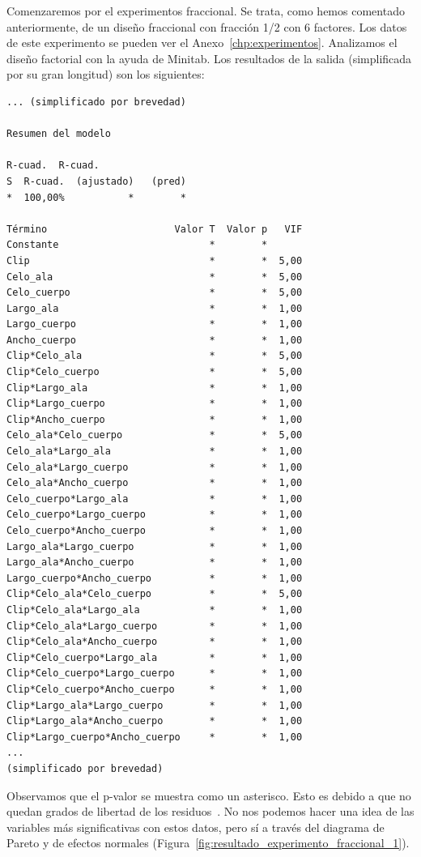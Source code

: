 \documentclass[12pt,a4paper,twoside,openright,titlepage,final]{article}
\begin{document}
Comenzaremos por el experimentos fraccional. Se trata, como hemos comentado anteriormente, de un diseño fraccional con fracción 1/2 con 6 factores. Los datos de este experimento se pueden ver el Anexo~\ref{chp:experimentos}. Analizamos el diseño factorial con la ayuda de Minitab. Los resultados de la salida (simplificada por su gran longitud) son los siguientes:

\begin{verbatim}
... (simplificado por brevedad)

Resumen del modelo

R-cuad.  R-cuad.
S  R-cuad.  (ajustado)   (pred)
*  100,00%           *        *

Término                      Valor T  Valor p   VIF
Constante                          *        *
Clip                               *        *  5,00
Celo_ala                           *        *  5,00
Celo_cuerpo                        *        *  5,00
Largo_ala                          *        *  1,00
Largo_cuerpo                       *        *  1,00
Ancho_cuerpo                       *        *  1,00
Clip*Celo_ala                      *        *  5,00
Clip*Celo_cuerpo                   *        *  5,00
Clip*Largo_ala                     *        *  1,00
Clip*Largo_cuerpo                  *        *  1,00
Clip*Ancho_cuerpo                  *        *  1,00
Celo_ala*Celo_cuerpo               *        *  5,00
Celo_ala*Largo_ala                 *        *  1,00
Celo_ala*Largo_cuerpo              *        *  1,00
Celo_ala*Ancho_cuerpo              *        *  1,00
Celo_cuerpo*Largo_ala              *        *  1,00
Celo_cuerpo*Largo_cuerpo           *        *  1,00
Celo_cuerpo*Ancho_cuerpo           *        *  1,00
Largo_ala*Largo_cuerpo             *        *  1,00
Largo_ala*Ancho_cuerpo             *        *  1,00
Largo_cuerpo*Ancho_cuerpo          *        *  1,00
Clip*Celo_ala*Celo_cuerpo          *        *  5,00
Clip*Celo_ala*Largo_ala            *        *  1,00
Clip*Celo_ala*Largo_cuerpo         *        *  1,00
Clip*Celo_ala*Ancho_cuerpo         *        *  1,00
Clip*Celo_cuerpo*Largo_ala         *        *  1,00
Clip*Celo_cuerpo*Largo_cuerpo      *        *  1,00
Clip*Celo_cuerpo*Ancho_cuerpo      *        *  1,00
Clip*Largo_ala*Largo_cuerpo        *        *  1,00
Clip*Largo_ala*Ancho_cuerpo        *        *  1,00
Clip*Largo_cuerpo*Ancho_cuerpo     *        *  1,00
... 
(simplificado por brevedad)

\end{verbatim}

Observamos que el p-valor se muestra como un asterisco. Esto es debido a que no quedan grados de libertad de los residuos~\cite{Asterik}. No nos podemos hacer una idea de las variables más significativas con estos datos, pero sí a través del diagrama de Pareto y de efectos normales (Figura~\ref{fig:resultado_experimento_fraccional_1}).\\
\end{document}
